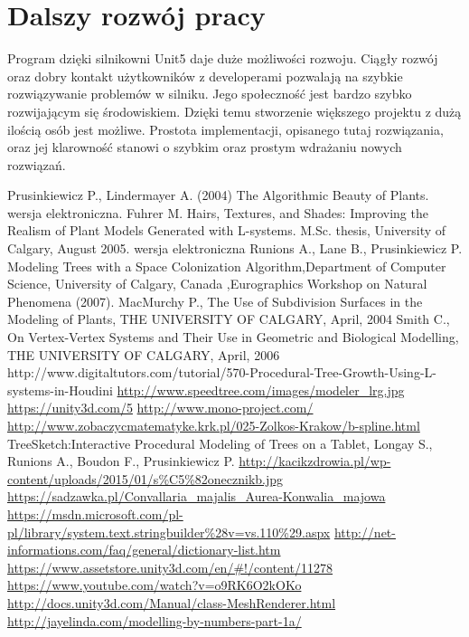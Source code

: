 \documentclass[12pt]{report}
\begin{document}
\begin{sloppypar}
\section{Dalszy rozwój pracy}
Program dzięki silnikowni Unit5 daje duże możliwości rozwoju. Ciągły rozwój oraz dobry kontakt użytkowników z developerami pozwalają na szybkie rozwiązywanie problemów w silniku. Jego społeczność  jest bardzo szybko rozwijającym się środowiskiem. Dzięki temu stworzenie większego projektu z dużą ilością osób jest możliwe. Prostota implementacji, opisanego tutaj rozwiązania, oraz jej klarowność stanowi o szybkim oraz prostym wdrażaniu nowych rozwiązań. 
\begin{thebibliography}{99}
Prusinkiewicz P., Lindermayer A. (2004) The Algorithmic Beauty of Plants.  wersja elektroniczna.
Fuhrer M. Hairs, Textures, and Shades: Improving the Realism of Plant Models Generated with L-systems. M.Sc. thesis, University of Calgary, August 2005. wersja elektroniczna
Runions A., Lane B., Prusinkiewicz P. Modeling Trees with a Space Colonization Algorithm,Department of Computer Science, University of Calgary, Canada ,Eurographics Workshop on Natural Phenomena (2007).
 MacMurchy P., The Use of Subdivision Surfaces in the Modeling of Plants, THE UNIVERSITY OF CALGARY, April, 2004
 Smith C., On Vertex-Vertex Systems and Their Use in Geometric and Biological Modelling, THE UNIVERSITY OF CALGARY, April, 2006
http://www.digitaltutors.com/tutorial/570-Procedural-Tree-Growth-Using-L-systems-in-Houdini
\url{http://www.speedtree.com/images/modeler_lrg.jpg}
\url{https://unity3d.com/5}
\url{http://www.mono-project.com/}
\url{http://www.zobaczycmatematyke.krk.pl/025-Zolkos-Krakow/b-spline.html}
TreeSketch:Interactive Procedural Modeling of Trees on a Tablet, Longay S.,  Runions A., Boudon F., Prusinkiewicz P.
\url{http://kacikzdrowia.pl/wp-content/uploads/2015/01/s%C5%82onecznikb.jpg}
\url{https://sadzawka.pl/Convallaria_majalis_Aurea-Konwalia_majowa}
\url{https://msdn.microsoft.com/pl-pl/library/system.text.stringbuilder%28v=vs.110%29.aspx}
\url{http://net-informations.com/faq/general/dictionary-list.htm}
\url{https://www.assetstore.unity3d.com/en/#!/content/11278}
\url{https://www.youtube.com/watch?v=o9RK6O2kOKo}
\url{http://docs.unity3d.com/Manual/class-MeshRenderer.html}
\url{http://jayelinda.com/modelling-by-numbers-part-1a/}


\end{thebibliography}
\end{sloppypar}
\end{document}
